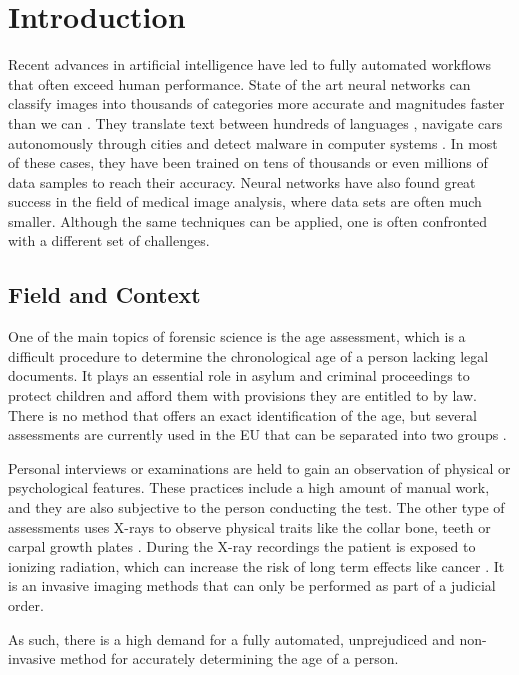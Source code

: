 \section{Introduction}

Recent advances in artificial intelligence have led to fully automated workflows that often exceed human performance. State of the art neural networks can classify images into thousands of categories more accurate and magnitudes faster than we can \cite{He2015a}. They translate text between hundreds of languages \cite{Wu2016}, navigate cars autonomously through cities \cite{Bojarski2017} and detect malware in computer systems \cite{Saxe2015}. In most of these cases, they have been trained on tens of thousands or even millions of data samples to reach their accuracy. Neural networks have also found great success in the field of medical image analysis, where data sets are often much smaller. Although the same techniques can be applied, one is often confronted with a different set of challenges.

\subsection{Field and Context}

One of the main topics of forensic science is the age assessment, which is a difficult procedure to determine the chronological age of a person lacking legal documents. It plays an essential role in asylum and criminal proceedings to protect children and afford them with provisions they are entitled to by law. There is no method that offers an exact identification of the age, but several assessments are currently used in the EU that can be separated into two groups \cite{EuropeanAsylumSupportOffice2013}.

Personal interviews or examinations are held to gain an observation of physical or psychological features. These practices include a high amount of manual work, and they are also subjective to the person conducting the test. The other type of assessments uses X-rays to observe physical traits like the collar bone, teeth or carpal growth plates \cite{EuropeanAsylumSupportOffice2013}. During the X-ray recordings the patient is exposed to ionizing radiation, which can increase the risk of long term effects like cancer \cite{WorldHealthOrganization2016}. It is an invasive imaging methods that can only be performed as part of a judicial order.

As such, there is a high demand for a fully automated, unprejudiced and non-invasive method for accurately determining the age of a person.

